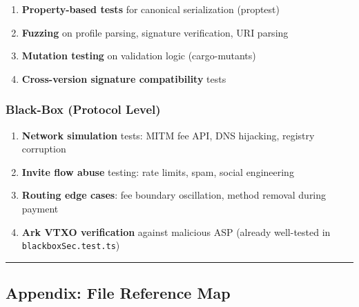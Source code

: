 \documentclass[
]{article}
\providecommand{\tightlist}{%
  \setlength{\itemsep}{0pt}\setlength{\parskip}{0pt}}
\begin{document}
\begin{enumerate}
\def\labelenumi{\arabic{enumi}.}
\tightlist
\item
  \textbf{Property-based tests} for canonical serialization (proptest)
\item
  \textbf{Fuzzing} on profile parsing, signature verification, URI
  parsing
\item
  \textbf{Mutation testing} on validation logic (cargo-mutants)
\item
  \textbf{Cross-version signature compatibility} tests
\end{enumerate}

\hypertarget{black-box-protocol-level}{%
\subsubsection{Black-Box (Protocol
Level)}\label{black-box-protocol-level}}

\begin{enumerate}
\def\labelenumi{\arabic{enumi}.}
\tightlist
\item
  \textbf{Network simulation} tests: MITM fee API, DNS hijacking,
  registry corruption
\item
  \textbf{Invite flow abuse} testing: rate limits, spam, social
  engineering
\item
  \textbf{Routing edge cases}: fee boundary oscillation, method removal
  during payment
\item
  \textbf{Ark VTXO verification} against malicious ASP (already
  well-tested in \texttt{blackboxSec.test.ts})
\end{enumerate}

\begin{center}\rule{0.5\linewidth}{0.5pt}\end{center}

\hypertarget{appendix-file-reference-map}{%
\subsection{Appendix: File Reference
Map}\label{appendix-file-reference-map}}
\end{document}
